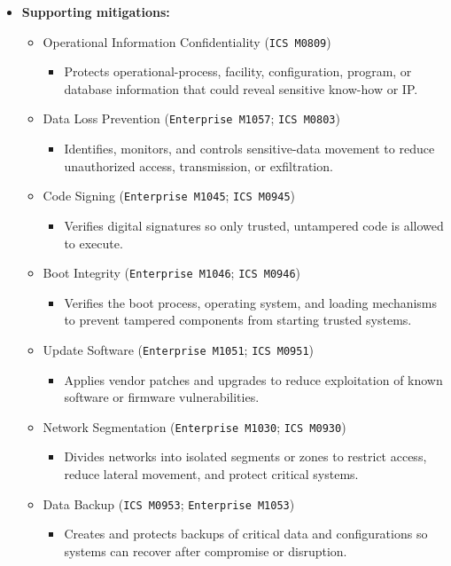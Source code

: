 \documentclass[10pt,a4paper,oneside]{report}
\begin{document}
\begin{itemize}
\item \textbf{Supporting mitigations:}
\begin{itemize}
\item Operational Information Confidentiality (\texttt{ICS M0809})
\begin{itemize}
\item Protects operational-process, facility, configuration, program, or database information that could reveal sensitive know-how or IP.
\end{itemize}
\item Data Loss Prevention (\texttt{Enterprise M1057}; \texttt{ICS M0803})
\begin{itemize}
\item Identifies, monitors, and controls sensitive-data movement to reduce unauthorized access, transmission, or exfiltration.
\end{itemize}
\item Code Signing (\texttt{Enterprise M1045}; \texttt{ICS M0945})
\begin{itemize}
\item Verifies digital signatures so only trusted, untampered code is allowed to execute.
\end{itemize}
\item Boot Integrity (\texttt{Enterprise M1046}; \texttt{ICS M0946})
\begin{itemize}
\item Verifies the boot process, operating system, and loading mechanisms to prevent tampered components from starting trusted systems.
\end{itemize}
\item Update Software (\texttt{Enterprise M1051}; \texttt{ICS M0951})
\begin{itemize}
\item Applies vendor patches and upgrades to reduce exploitation of known software or firmware vulnerabilities.
\end{itemize}
\item Network Segmentation (\texttt{Enterprise M1030}; \texttt{ICS M0930})
\begin{itemize}
\item Divides networks into isolated segments or zones to restrict access, reduce lateral movement, and protect critical systems.
\end{itemize}
\item Data Backup (\texttt{ICS M0953}; \texttt{Enterprise M1053})
\begin{itemize}
\item Creates and protects backups of critical data and configurations so systems can recover after compromise or disruption.
\end{itemize}
\end{itemize}
\end{itemize}
\end{document}
